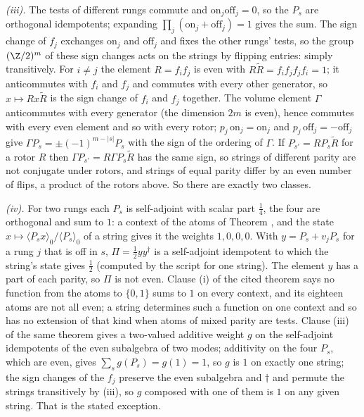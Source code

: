 \emph{(iii).} The tests of different rungs commute and $\mathrm{on}_{j}\mathrm{off}_{j} = 0$, so the $P_{s}$ are orthogonal idempotents; expanding $\prod_{j}(\mathrm{on}_{j} + \mathrm{off}_{j}) = 1$ gives the sum. The sign change of $f_{j}$ exchanges $\mathrm{on}_{j}$ and $\mathrm{off}_{j}$ and fixes the other rungs' tests, so the group $(\Z/2)^{m}$ of these sign changes acts on the strings by flipping entries: simply transitively. For $i \ne j$ the element $R = f_{i}f_{j}$ is even with $R\tilde{R} = f_{i}f_{j}f_{j}f_{i} = 1$; it anticommutes with $f_{i}$ and $f_{j}$ and commutes with every other generator, so $x \mapsto Rx\tilde{R}$ is the sign change of $f_{i}$ and $f_{j}$ together. The volume element $\Gamma$ anticommutes with every generator (the dimension $2m$ is even), hence commutes with every even element and so with every rotor; $p_{j}\,\mathrm{on}_{j} = \mathrm{on}_{j}$ and $p_{j}\,\mathrm{off}_{j} = -\mathrm{off}_{j}$ give $\Gamma P_{s} = \pm(-1)^{m - |s|}P_{s}$ with the sign of the ordering of $\Gamma$. If $P_{s'} = RP_{s}\tilde{R}$ for a rotor $R$ then $\Gamma P_{s'} = R\Gamma P_{s}\tilde{R}$ has the same sign, so strings of different parity are not conjugate under rotors, and strings of equal parity differ by an even number of flips, a product of the rotors above. So there are exactly two classes.

\emph{(iv).} For two rungs each $P_{s}$ is self-adjoint with scalar part $\tfrac14$, the four are orthogonal and sum to $1$: a context of the atoms of Theorem , and the state $x \mapsto \langle P_{s}x\rangle_{0}/\langle P_{s}\rangle_{0}$ of a string gives it the weights $1, 0, 0, 0$. With $y = P_{s} + v_{j}P_{s}$ for a rung $j$ that is off in $s$, $\Pi = \tfrac12 yy^{\dagger}$ is a self-adjoint idempotent to which the string's state gives $\tfrac12$ (computed by the script for one string). The element $y$ has a part of each parity, so $\Pi$ is not even. Clause (i) of the cited theorem says no function from the atoms to $\{0, 1\}$ sums to $1$ on every context, and its eighteen atoms are not all even; a string determines such a function on one context and so has no extension of that kind when atoms of mixed parity are tests. Clause (iii) of the same theorem gives a two-valued additive weight $g$ on the self-adjoint idempotents of the even subalgebra of two modes; additivity on the four $P_{s}$, which are even, gives $\sum_{s}g(P_{s}) = g(1) = 1$, so $g$ is $1$ on exactly one string; the sign changes of the $f_{j}$ preserve the even subalgebra and $\dagger$ and permute the strings transitively by (iii), so $g$ composed with one of them is $1$ on any given string. That is the stated exception.

